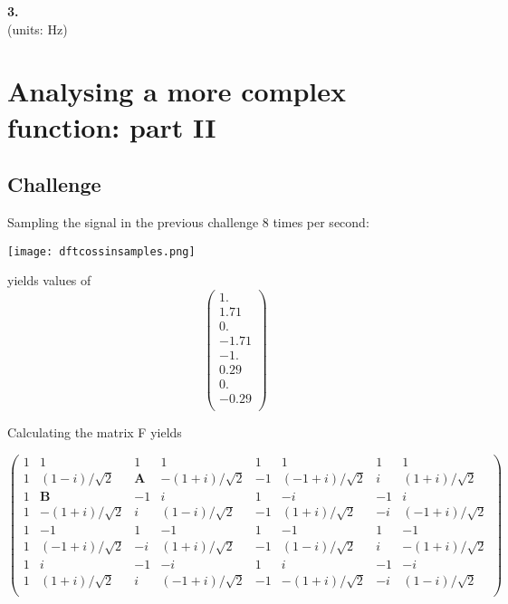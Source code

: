 \textbf{3.}\\
(units: Hz)\\




\newpage
\section{Analysing a more complex function: part II}

\subsection*{Challenge}
Sampling the signal in the previous challenge 8 times per second:

\texttt{[image: dftcossinsamples.png]}

yields values of
\begin{equation}
   \left(
\begin{array}{c}
 1. \\
 1.71 \\
 0. \\
 -1.71 \\
 -1. \\
 0.29 \\
 0. \\
 -0.29 \\
\end{array}
\right) 
\end{equation}

Calculating the matrix F yields

\begin{equation}
   \left(
\begin{array}{cccccccc}
 1 & 1              & 1 & 1 & 1 & 1 & 1 & 1 \\
 1 & (1-i)/\sqrt{2} & \bm{A} & -(1+i)/\sqrt{2} & -1 & (-1+i)/\sqrt{2} & i & (1+i)/\sqrt{2} \\
 1 & \bm{B}         & -1 & i & 1 & -i & -1 & i \\
 1 & -(1+i)/\sqrt{2}& i & (1-i)/\sqrt{2} & -1 & (1+i)/\sqrt{2} & -i & (-1+i)/\sqrt{2} \\
 1 & -1             & 1 & -1 & 1 & -1 & 1 & -1 \\
 1 & (-1+i)/\sqrt{2}& -i & (1+i)/\sqrt{2} & -1 & (1-i)/\sqrt{2} & i & -(1+i)/\sqrt{2} \\
 1 & i              & -1 & -i & 1 & i & -1 & -i \\
 1 & (1+i)/\sqrt{2} & i & (-1+i)/\sqrt{2} & -1 & -(1+i)/\sqrt{2} & -i & (1-i)/\sqrt{2} \\
\end{array}
\right) 
\end{equation}

